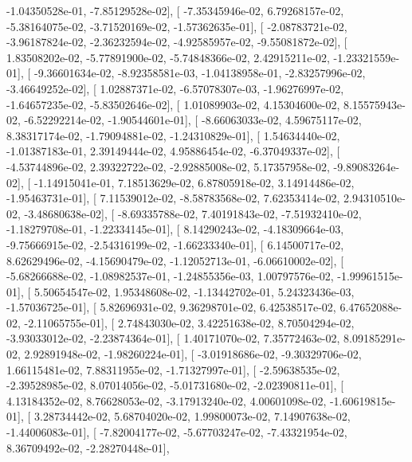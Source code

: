 \documentclass{article}
\begin{document}
         -1.04350528e-01,  -7.85129528e-02],
       [ -7.35345946e-02,   6.79268157e-02,  -5.38164075e-02,
         -3.71520169e-02,  -1.57362635e-01],
       [ -2.08783721e-02,  -3.96187824e-02,  -2.36232594e-02,
         -4.92585957e-02,  -9.55081872e-02],
       [  1.83508202e-02,  -5.77891900e-02,  -5.74848366e-02,
          2.42915211e-02,  -1.23321559e-01],
       [ -9.36601634e-02,  -8.92358581e-03,  -1.04138958e-01,
         -2.83257996e-02,  -3.46649252e-02],
       [  1.02887371e-02,  -6.57078307e-03,  -1.96276997e-02,
         -1.64657235e-02,  -5.83502646e-02],
       [  1.01089903e-02,   4.15304600e-02,   8.15575943e-02,
         -6.52292214e-02,  -1.90544601e-01],
       [ -8.66063033e-02,   4.59675117e-02,   8.38317174e-02,
         -1.79094881e-02,  -1.24310829e-01],
       [  1.54634440e-02,  -1.01387183e-01,   2.39149444e-02,
          4.95886454e-02,  -6.37049337e-02],
       [ -4.53744896e-02,   2.39322722e-02,  -2.92885008e-02,
          5.17357958e-02,  -9.89083264e-02],
       [ -1.14915041e-01,   7.18513629e-02,   6.87805918e-02,
          3.14914486e-02,  -1.95463731e-01],
       [  7.11539012e-02,  -8.58783568e-02,   7.62353414e-02,
          2.94310510e-02,  -3.48680638e-02],
       [ -8.69335788e-02,   7.40191843e-02,  -7.51932410e-02,
         -1.18279708e-01,  -1.22334145e-01],
       [  8.14290243e-02,  -4.18309664e-03,  -9.75666915e-02,
         -2.54316199e-02,  -1.66233340e-01],
       [  6.14500717e-02,   8.62629496e-02,  -4.15690479e-02,
         -1.12052713e-01,  -6.06610002e-02],
       [ -5.68266688e-02,  -1.08982537e-01,  -1.24855356e-03,
          1.00797576e-02,  -1.99961515e-01],
       [  5.50654547e-02,   1.95348608e-02,  -1.13442702e-01,
          5.24323436e-03,  -1.57036725e-01],
       [  5.82696931e-02,   9.36298701e-02,   6.42538517e-02,
          6.47652088e-02,  -2.11065755e-01],
       [  2.74843030e-02,   3.42251638e-02,   8.70504294e-02,
         -3.93033012e-02,  -2.23874364e-01],
       [  1.40171070e-02,   7.35772463e-02,   8.09185291e-02,
          2.92891948e-02,  -1.98260224e-01],
       [ -3.01918686e-02,  -9.30329706e-02,   1.66115481e-02,
          7.88311955e-02,  -1.71327997e-01],
       [ -2.59638535e-02,  -2.39528985e-02,   8.07014056e-02,
         -5.01731680e-02,  -2.02390811e-01],
       [  4.13184352e-02,   8.76628053e-02,  -3.17913240e-02,
          4.00601098e-02,  -1.60619815e-01],
       [  3.28734442e-02,   5.68704020e-02,   1.99800073e-02,
          7.14907638e-02,  -1.44006083e-01],
       [ -7.82004177e-02,  -5.67703247e-02,  -7.43321954e-02,
          8.36709492e-02,  -2.28270448e-01],
\end{document}
